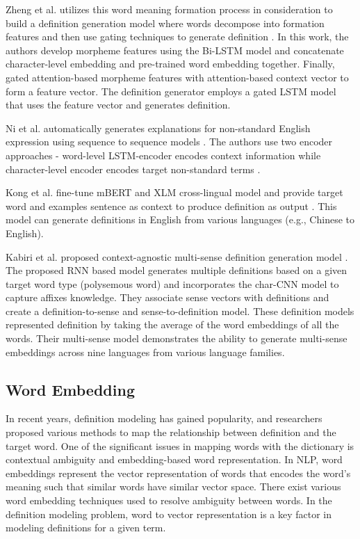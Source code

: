 Zheng et al. utilizes this word meaning formation process in consideration to
build a definition generation model where words decompose into formation
features and then use gating techniques to generate definition
\cite{zheng_decompose_2021}. In this work, the authors develop morpheme features
using the Bi-LSTM model and concatenate character-level embedding and
pre-trained word embedding together. Finally, gated attention-based morpheme
features with attention-based context vector to form a feature vector. The
definition generator employs a gated LSTM model that uses the feature vector and
generates definition.

Ni et al. automatically generates explanations for non-standard English
expression using sequence to sequence models \cite{ni_learning_2017}. The
authors use two encoder approaches - word-level LSTM-encoder encodes context
information while character-level encoder encodes target non-standard terms
\cite{ni_learning_2017}.

Kong et al. fine-tune mBERT and XLM cross-lingual model and provide target word
and examples sentence as context to produce definition as output
\cite{kong_toward_2020}. This model can generate definitions in English from
various languages (e.g., Chinese to English).

Kabiri et al. proposed context-agnostic multi-sense definition generation model
\cite{kabiri_evaluating_2020}. The proposed RNN based model generates multiple
definitions based on a given target word type (polysemous word) and incorporates
the char-CNN model to capture affixes knowledge. They associate sense vectors
with definitions and create a definition-to-sense and sense-to-definition model.
These definition models represented definition by taking the average of the word
embeddings of all the words. Their multi-sense model demonstrates the ability to
generate multi-sense embeddings across nine languages from various language
families.

\subsection{Word Embedding}
In recent years, definition modeling has gained popularity, and researchers
proposed various methods to map the relationship between definition and the
target word. One of the significant issues in mapping words with the dictionary
is contextual ambiguity and embedding-based word representation. In NLP, word
embeddings represent the vector representation of words that encodes the word's
meaning such that similar words have similar vector space. There exist various
word embedding techniques used to resolve ambiguity between words. In the
definition modeling problem, word to vector representation is a key factor in
modeling definitions for a given term.

